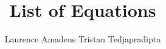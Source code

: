 \documentclass[a4paper]{article}
\title{List of Equations}
\author{Laurence Amadeus Tristan Tedjapradipta}
\begin{document}
\maketitle
\pagebreak

\pagebreak

\end{document}
